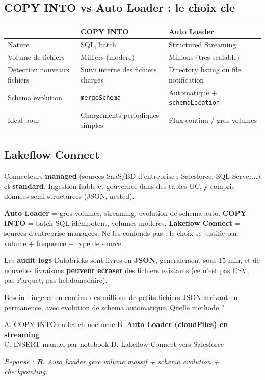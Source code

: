 \documentclass[11pt,a4paper]{article}
\begin{document}
\subsection{COPY INTO vs Auto Loader : le choix cle}

\begin{center}
\renewcommand{\arraystretch}{1.3}
\begin{tabular}{@{}p{4.5cm}p{4.7cm}p{4.7cm}@{}}
\toprule
 & \textbf{COPY INTO} & \textbf{Auto Loader} \\
\midrule
Nature & SQL, batch & Structured Streaming \\
Volume de fichiers & Milliers (modere) & Millions (tres scalable) \\
Detection nouveaux fichiers & Suivi interne des fichiers charges & Directory listing ou file notification \\
Schema evolution & \texttt{mergeSchema} & Automatique + \texttt{schemaLocation} \\
Ideal pour & Chargements periodiques simples & Flux continu / gros volumes \\
\bottomrule
\end{tabular}
\end{center}

\subsection{Lakeflow Connect}

Connecteurs \textbf{managed} (sources SaaS/BD d'entreprise : Salesforce, SQL Server...) et
\textbf{standard}. Ingestion fiable et gouvernee dans des tables UC, y compris donnees
semi-structurees (JSON, nested).

\begin{piege}
\textbf{Auto Loader} = gros volumes, streaming, evolution de schema auto. \textbf{COPY INTO}
= batch SQL idempotent, volumes moderes. \textbf{Lakeflow Connect} = sources d'entreprise
managees. Ne les confonds pas : le choix se justifie par volume + frequence + type de source.
\end{piege}

\begin{piege}
Les \textbf{audit logs} Databricks sont livres en \textbf{JSON}, generalement sous 15 min,
et de nouvelles livraisons \textbf{peuvent ecraser} des fichiers existants (ce n'est pas
CSV, pas Parquet, pas hebdomadaire).
\end{piege}

\begin{qcm}
Besoin : ingerer en continu des millions de petits fichiers JSON arrivant en permanence,
avec evolution de schema automatique. Quelle methode ?

\smallskip
A. COPY INTO en batch nocturne \hfill
B. \textbf{Auto Loader (cloudFiles) en streaming} \\
C. INSERT manuel par notebook \hfill
D. Lakeflow Connect vers Salesforce

\smallskip
\textit{Reponse : \textbf{B}. Auto Loader gere volume massif + schema evolution + checkpointing.}
\end{qcm}
\end{document}

